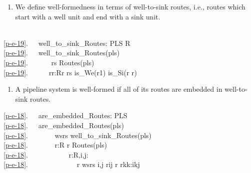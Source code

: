 \mnewfoil

\begin{enumerate}\setei
\item \label{p-e-19}  We define well-formedness in terms of
  well-to-sink routes, i.e., routes which start with a well unit and
  end with a sink unit.
\savei\end{enumerate}

\bp
\>\ \ \ \ \\
\ref{p-e-19}.\ \ \ well\_to\_sink\_Routes: PLS {\RIGHTARROW} R\\
\ref{p-e-19}.\ \ \ well\_to\_sink\_Routes(pls) {\IS}\\
\ref{p-e-19}.\ \ \ \ \ \  rs {\EQ} Routes(pls) \\
\ref{p-e-19}.\ \ \ \ \ \ {\LBRACE}r{\BAR}r:R{\RDOT}r {\ISIN} rs {\WEDGE} is\_We(r{\LBRACKET}1{\RBRACKET}) {\WEDGE} is\_Si(r{\LBRACKET} r{\RBRACKET}){\RBRACE} 
\ep

\mnewfoil

\begin{enumerate}\setei
\item \label{p-e-18} A pipeline system is well-formed
      if all of its routes are embedded in well-to-sink routes.
\savei\end{enumerate}

\bp
\ref{p-e-18}.\ \ \ are\_embedded\_Routes: PLS {\RIGHTARROW} \\
\ref{p-e-18}.\ \ \ are\_embedded\_Routes(pls) {\IS}\ \ \ \\
\ref{p-e-18}.\ \ \ \ \ \ \  wsrs {\EQ} well\_to\_sink\_Routes(pls) \\
\ref{p-e-18}.\ \ \ \ \ \ \ {\ALL} r:R {\RDOT} r {\ISIN} Routes(pls) {\DBLRIGHTARROW}\\
\ref{p-e-18}.\ \ \ \ \ \ \ \ \ \ \ {\EXISTS} r{\PRIM}:R,i,j: {\RDOT} \\
\ref{p-e-18}.\ \ \ \ \ \ \ \ \ \ \ \ \ \ r{\PRIM} {\ISIN} wsrs {\WEDGE} {\LBRACE}i,j{\RBRACE}{\SUBSETEQ} r{\PRIM}{\WEDGE}i{\LEQ}j {\WEDGE} r {\EQ} {\LANGLE}r{\PRIM}{\LBRACKET}k{\RBRACKET}{\BAR}k:i{\LEQ}k{\LEQ}j{\RANGLE} 
\ep

